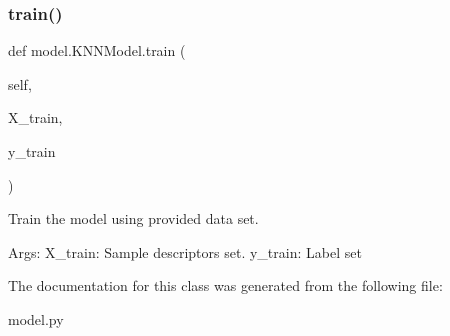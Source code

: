 \subsubsection{\texorpdfstring{train()}{train()}}
{\footnotesize\ttfamily def model.\+K\+N\+N\+Model.\+train (\begin{DoxyParamCaption}\item[{}]{self,  }\item[{}]{X\+\_\+train,  }\item[{}]{y\+\_\+train }\end{DoxyParamCaption})}



Train the model using provided data set. 

Args\+: X\+\_\+train\+: Sample descriptors set. y\+\_\+train\+: Label set 

The documentation for this class was generated from the following file\+:\begin{DoxyCompactItemize}
\item 
model.\+py\end{DoxyCompactItemize}
